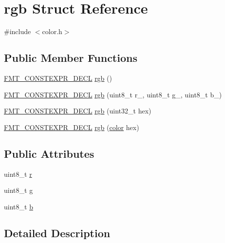 \hypertarget{structrgb}{}\section{rgb Struct Reference}
\label{structrgb}


{\ttfamily \#include $<$color.\+h$>$}

\subsection*{Public Member Functions}
\begin{DoxyCompactItemize}
\item 
\hyperlink{core_8h_af4388801466a5994a363d6005616371a}{F\+M\+T\+\_\+\+C\+O\+N\+S\+T\+E\+X\+P\+R\+\_\+\+D\+E\+CL} \hyperlink{structrgb_a45da96e6d5076fa914f230f4258eacf2}{rgb} ()
\item 
\hyperlink{core_8h_af4388801466a5994a363d6005616371a}{F\+M\+T\+\_\+\+C\+O\+N\+S\+T\+E\+X\+P\+R\+\_\+\+D\+E\+CL} \hyperlink{structrgb_a6a2cb3ed813662a41239b561e240e54b}{rgb} (uint8\+\_\+t r\+\_\+, uint8\+\_\+t g\+\_\+, uint8\+\_\+t b\+\_\+)
\item 
\hyperlink{core_8h_af4388801466a5994a363d6005616371a}{F\+M\+T\+\_\+\+C\+O\+N\+S\+T\+E\+X\+P\+R\+\_\+\+D\+E\+CL} \hyperlink{structrgb_a607e4a0987218581bcc680c6822bd35f}{rgb} (uint32\+\_\+t hex)
\item 
\hyperlink{core_8h_af4388801466a5994a363d6005616371a}{F\+M\+T\+\_\+\+C\+O\+N\+S\+T\+E\+X\+P\+R\+\_\+\+D\+E\+CL} \hyperlink{structrgb_afca0dec9f937cc454d31aa4a724fbf48}{rgb} (\hyperlink{color_8h_a80d1dc5f416b97f92939a4166d41203c}{color} hex)
\end{DoxyCompactItemize}
\subsection*{Public Attributes}
\begin{DoxyCompactItemize}
\item 
uint8\+\_\+t \hyperlink{structrgb_afd9a3feaf22de2f96ba25d19494235a6}{r}
\item 
uint8\+\_\+t \hyperlink{structrgb_a644713f43fbcf5e9f070fa1843aee55f}{g}
\item 
uint8\+\_\+t \hyperlink{structrgb_a5ff4e0f515919a82c3f401afa8555da4}{b}
\end{DoxyCompactItemize}


\subsection{Detailed Description}


